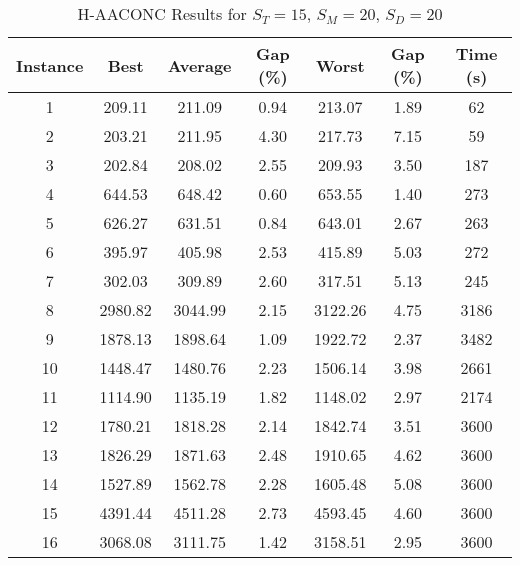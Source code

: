 \begin{table}[h]
	\centering
	\caption{H-AACONC Results for $S_T=15$, $S_M=20$, $S_D=20$}
	\begin{tabular}{@{}ccccccc@{}}
		\midrule
		\textbf{Instance} & \textbf{Best} & \textbf{Average} & \textbf{Gap (\%)} & \textbf{Worst} & \textbf{Gap (\%)} & \textbf{Time (s)} \\ \midrule
		1  & 209.11 & 211.09 & 0.94 & 213.07 & 1.89 & 62   \\ \midrule
		2  & 203.21 & 211.95 & 4.30 & 217.73 & 7.15 & 59   \\ \midrule
		3  & 202.84 & 208.02 & 2.55 & 209.93 & 3.50 & 187  \\ \midrule
		4  & 644.53 & 648.42 & 0.60 & 653.55 & 1.40 & 273  \\ \midrule
		5  & 626.27 & 631.51 & 0.84 & 643.01 & 2.67 & 263  \\ \midrule
		6  & 395.97 & 405.98 & 2.53 & 415.89 & 5.03 & 272  \\ \midrule
		7  & 302.03 & 309.89 & 2.60 & 317.51 & 5.13 & 245  \\ \midrule
		8  & 2980.82 & 3044.99 & 2.15 & 3122.26 & 4.75 & 3186  \\ \midrule
		9  & 1878.13 & 1898.64 & 1.09 & 1922.72 & 2.37 & 3482  \\ \midrule
		10 & 1448.47 & 1480.76 & 2.23 & 1506.14 & 3.98 & 2661  \\ \midrule
		11 & 1114.90 & 1135.19 & 1.82 & 1148.02 & 2.97 & 2174  \\ \midrule
		12 & 1780.21 & 1818.28 & 2.14 & 1842.74 & 3.51 & 3600  \\ \midrule
		13 & 1826.29 & 1871.63 & 2.48 & 1910.65 & 4.62 & 3600  \\ \midrule
		14 & 1527.89 & 1562.78 & 2.28 & 1605.48 & 5.08 & 3600  \\ \midrule
		15 & 4391.44 & 4511.28 & 2.73 & 4593.45 & 4.60 & 3600  \\ \midrule
		16 & 3068.08 & 3111.75 & 1.42 & 3158.51 & 2.95 & 3600  \\ \midrule
	\end{tabular}
	\label{table:ACO_15-20-20}
\end{table}
